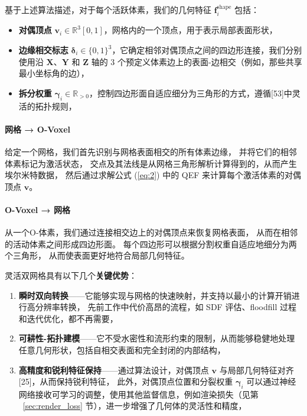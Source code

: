 基于上述算法描述，对于每个活跃体素，我们的几何特征  
$\bm{f}^{\text{shape}}_i$  
包括：
\begin{itemize}
\item \textbf{对偶顶点} $\bm{v}_i \in \mathbb{R}^3 [0,1]$，网格内的一个顶点，用于表示局部表面形状，
\item \textbf{边缘相交标志} $\bm{\delta}_i \in \{0,1\}^3$，它确定相邻对偶顶点之间的四边形连接，我们分别使用沿 $\bm{X}$、$\bm{Y}$ 和 $\bm{Z}$ 轴的 3 个预定义体素边上的表面-边相交（例如，那些共享最小坐标角的边），
\item \textbf{拆分权重} $\bm{\gamma}_i \in \mathbb{R}_{>0}$，控制四边形面自适应细分为三角形的方式，遵循[53]中灵活的拓扑规则，
\end{itemize}

\paragraph{网格 → O-Voxel}
给定一个网格，我们首先识别与网格表面相交的所有体素边缘，
并将它们的相邻体素标记为激活状态，  
交点及其法线是从网格三角形解析计算得到的，从而产生埃尔米特数据，  
然后通过求解公式 (\ref{eq:2}) 中的 QEF 来计算每个激活体素的对偶顶点 $\bm{v}$。

\paragraph{O-Voxel → 网格}
从一个O-体素，我们通过连接相交边上的对偶顶点来恢复网格表面，
从而在相邻的活动体素之间形成四边形面。
每个四边形可以根据分割权重自适应地细分为两个三角形，
从而使表面更好地符合局部几何特征。

灵活双网格具有以下几个\textbf{关键优势}：
\begin{enumerate}
\item \textbf{瞬时双向转换}——它能够实现与网格的快速映射，并支持以最小的计算开销进行高分辨率转换，  
先前工作中代价高昂的流程，如 SDF 评估、floodfill 过程和迭代优化，都不再需要，
\item \textbf{可耕性-拓扑建模}——它不受水密性和流形约束的限制，从而能够稳健地处理任意几何形状，包括自相交表面和完全封闭的内部结构，
\item \textbf{高精度和锐利特征保持}——通过算法设计，对偶顶点 $\bm{v}$ 与局部几何特征对齐[25]，从而保持锐利特征，  
此外，对偶顶点位置和分裂权重 $\bm{\gamma}_i$ 可以通过神经网络接收可学习的调整，使用其他监督信息，例如渲染损失（见第 ~\ref{sec:render_loss} 节），进一步增强了几何体的灵活性和精度，
\end{enumerate}

